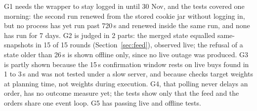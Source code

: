  G1 needs the wrapper to stay logged in until 30 Nov, and the tests covered one morning: the second run renewed from the stored cookie jar without logging in, but no process has yet run past 720\,s and renewed inside the same run, and none has run for 7 days. G2 is judged in 2 parts: the merged state equalled same- snapshots in 15 of 15 rounds (Section~\ref{sec:feed}), observed live; the refusal of a state older than 26\,s is shown offline only, since no live outage was produced. G3 is partly shown because the 15\,s confirmation window rests on live buys found in 1 to 3\,s and was not tested under a slow server, and because  checks target weights at planning time, not weights during execution. G4, that polling never delays an order, has no outcome measure yet; the tests show only that the feed and the orders share one event loop. G5 has passing live and offline tests.




